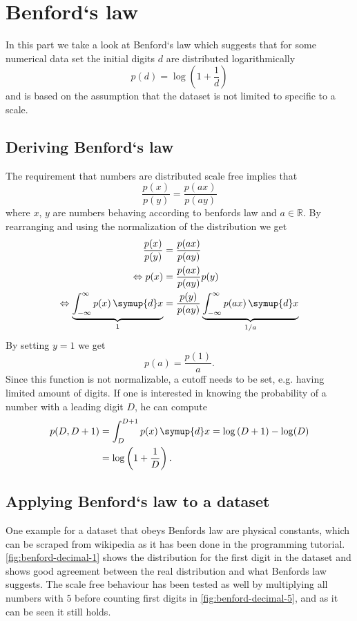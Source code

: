 \section{Benford`s law}
\label{sec:exercise-4}
In this part we take a look at Benford`s law which suggests that for some numerical data set the initial digits $d$ are
distributed logarithmically
\begin{equation}
  p(d) = \log\left(1 + \frac{1}{d}\right)
  \label{eqn:benford}
\end{equation}
and is based on the assumption that the dataset is not limited to specific to a scale.
\subsection{Deriving Benford`s law}
The requirement that numbers are distributed scale free implies that
\[
  \frac{p(x)}{p(y)} = \frac{p(ax)}{p(ay)}
\]
where $x$, $y$ are numbers behaving according to benfords law and $a\in\mathbb R$. By rearranging and using the
normalization of the distribution we get
\begin{align}
  \frac{p(x)}{p(y)} 
  &=\frac{p(ax)}{p(ay)} \\
  \Leftrightarrow
  p(x)
  &=\frac{p(ax)}{p(ay)} p(y) \\
  \Leftrightarrow
  \underbrace{\int_{-\infty}^{\infty} p(x) \, \symup{d}x}_{1}
  &= \frac{p(y)}{p(ay)} \underbrace{\int_{-\infty}^{\infty} p(ax) \, \symup{d}x}_{1/a} \\
\end{align}
By setting $y=1$ we get
\[
  p(a) = \frac{p(1)}{a}.
\]
Since this function is not normalizable, a cutoff needs to be set, e.g. having limited amount of digits. If one is
interested in knowing the probability of a number with a leading digit $D$, he can compute
\begin{align}
  p(D, D+1) &= \int_D^{D+1} p(x) \, \symup{d}x
  =
  \log\left(D+1\right) - \log(D) \\
            &= \log\left(1 + \frac1D\right).
\end{align}

\subsection{Applying Benford`s law to a dataset}
One example for a dataset that obeys Benfords law are physical constants, which can be scraped from wikipedia as it has
been done in the programming tutorial. \autoref{fig:benford-decimal-1} shows the distribution for the first digit in the
dataset and shows good agreement between the real distribution and what Benfords law suggests. The scale free behaviour
has been tested as well by multiplying all numbers with $5$ before counting first digits in
\autoref{fig:benford-decimal-5}, and as it can be seen it still holds.

